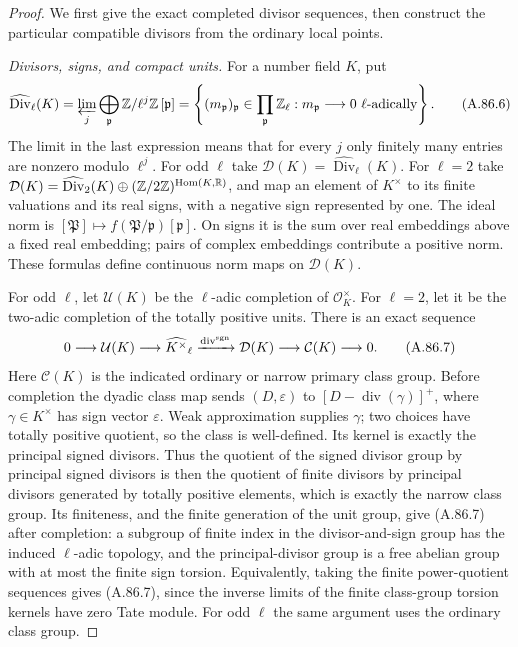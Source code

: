 \begin{proof}
We first give the exact completed divisor sequences, then construct
the particular compatible divisors from the ordinary local points.

\emph{Divisors, signs, and compact units.}
For a number field $K$, put
\[
 \widehat{\operatorname{Div}}_\ell(K)
 =\varprojlim_j\bigoplus_{\mathfrak p}
                                  \mathbb Z/\ell^j\mathbb Z\,[\mathfrak p]
 =\left\{(m_{\mathfrak p})_{\mathfrak p}\in
       \prod_{\mathfrak p}\mathbb Z_\ell:
       m_{\mathfrak p}\longrightarrow0\text{ $\ell$-adically}\right\}.
 \tag{A.86.6}
\]
The limit in the last expression means that for every $j$ only
finitely many entries are nonzero modulo $\ell^j$.
For odd $\ell$ take $\mathcal D(K)=
\widehat{\operatorname{Div}}_\ell(K)$.
For $\ell=2$ take
$\mathcal D(K)=\widehat{\operatorname{Div}}_2(K)
\oplus(\mathbb Z/2\mathbb Z)^{\operatorname{Hom}(K,\mathbb R)}$,
and map an element of $K^\times$ to its finite valuations and
its real signs, with a negative sign represented by one.
The ideal norm is
$[\mathfrak P]\mapsto f(\mathfrak P/\mathfrak p)[\mathfrak p]$.
On signs it is the sum over real embeddings above a fixed real
embedding; pairs of complex embeddings contribute a positive norm.
These formulas define continuous norm maps on $\mathcal D(K)$.

For odd $\ell$, let $\mathcal U(K)$ be the $\ell$-adic completion
of $\mathcal O_K^\times$.  For $\ell=2$, let it be the two-adic
completion of the totally positive units.  There is an exact
sequence
\[
 0\longrightarrow\mathcal U(K)\longrightarrow
 \widehat{K^\times}_\ell\xrightarrow{\operatorname{div}^{\rm sgn}}
 \mathcal D(K)\longrightarrow\mathcal C(K)\longrightarrow0.
 \tag{A.86.7}
\]
Here $\mathcal C(K)$ is the indicated ordinary or narrow primary
class group.  Before completion the dyadic class map sends
$(D,\varepsilon)$ to $[D-\operatorname{div}(\gamma)]^+$,
where $\gamma\in K^\times$ has sign vector $\varepsilon$.
Weak approximation supplies $\gamma$; two choices have totally
positive quotient, so the class is well-defined.  Its kernel is
exactly the principal signed divisors.  Thus the quotient of
the signed divisor group by principal signed divisors is then
the quotient of finite divisors by principal divisors generated
by totally positive elements, which is exactly the narrow class
group.  Its finiteness, and the finite generation of the unit
group, give (A.86.7) after completion: a subgroup of finite index
in the divisor-and-sign group has the induced $\ell$-adic topology,
and the principal-divisor group is a free abelian group with at
most the finite sign torsion.  Equivalently, taking the finite
power-quotient sequences gives (A.86.7), since the inverse limits
of the finite class-group torsion kernels have zero Tate module.
For odd $\ell$ the same argument uses the ordinary class group.


\end{proof}
